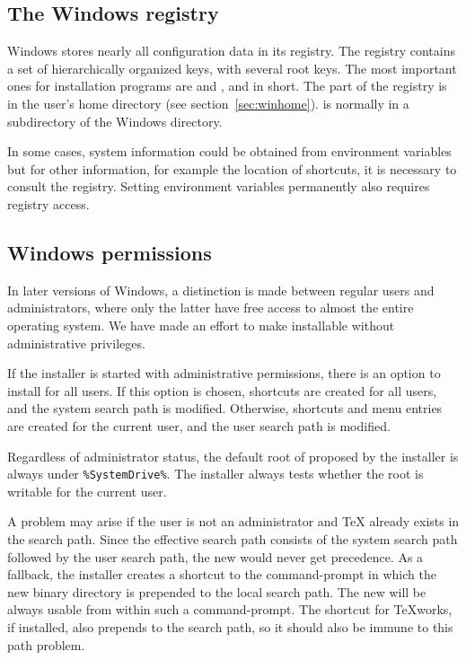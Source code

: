 \documentclass{article}
\begin{document}
\subsection{The Windows registry}
\label{sec:registry}

Windows stores nearly all configuration data in its registry.  The
registry contains a set of hierarchically organized keys, with several
root keys. The most important ones for installation programs are
 and ,  and
 in short. The  part of the registry is in the
user's home directory (see section~\ref{sec:winhome}).   is
normally in a subdirectory of the Windows directory.

In some cases, system information could be obtained from environment
variables but for other information, for example the location of
shortcuts, it is necessary to consult the registry.  Setting environment
variables permanently also requires registry access.


\subsection{Windows permissions}
\label{sec:winpermissions}

In later versions of Windows, a distinction is made between regular
users and administrators, where only the latter have free access to almost the
entire operating system. We have made an effort to make \TL{}
installable without administrative privileges.

If the installer is started with administrative permissions, there is an
option to install for all users.  If this option is chosen, shortcuts
are created for all users, and the system search path is
modified. Otherwise, shortcuts and menu entries are created for the
current user, and the user search path is modified.

Regardless of administrator status, the default root of \TL{} proposed
by the installer is always under \verb|%SystemDrive%|. The installer
always tests whether the root is writable for the current user.

A problem may arise if the user is not an administrator and \TeX{}
already exists in the search path.  Since the effective search path
consists of the system search path followed by the user search path, the
new \TL{} would never get precedence.  As a fallback, the installer
creates a shortcut to the command-prompt in which the new \TL{} binary
directory is prepended to the local search path.  The new \TL{} will be
always usable from within such a command-prompt. The shortcut for
\TeX{}works, if installed, also prepends \TL{} to the search path, so it
should also be immune to this path problem.
\end{document}
